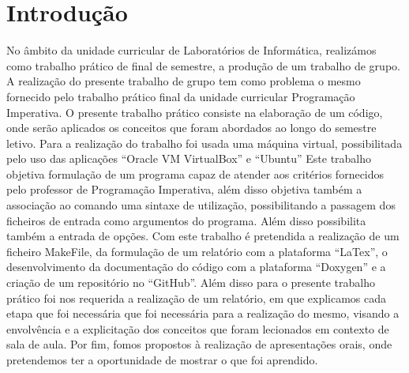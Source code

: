 \documentclass[a4wide]{report}
\begin{document}
\chapter{Introdução}
\Large
No âmbito da unidade curricular de Laboratórios de Informática, realizámos como trabalho prático de final de semestre, a produção de um trabalho de grupo. A realização do presente trabalho de grupo tem como problema o mesmo fornecido pelo trabalho prático final da unidade curricular Programação Imperativa. O presente trabalho prático consiste na elaboração de um código, onde serão aplicados os conceitos que foram abordados ao longo do semestre letivo. Para a realização do trabalho foi usada uma máquina virtual, possibilitada pelo uso das aplicações “Oracle VM VirtualBox” e “Ubuntu” Este trabalho objetiva formulação de um programa capaz de atender aos critérios fornecidos pelo professor de Programação Imperativa, além disso objetiva também a associação ao comando uma sintaxe de utilização, possibilitando a passagem dos ficheiros de entrada como argumentos do programa. Além disso possibilita também a entrada de opções. Com este trabalho é pretendida a realização de um ficheiro MakeFile, da formulação de um relatório com a plataforma “LaTex”, o desenvolvimento da documentação do código com a plataforma “Doxygen” e a criação de um repositório no “GitHub”. Além disso para o presente trabalho prático foi nos requerida a realização de um relatório, em que explicamos cada etapa que foi necessária que foi necessária para a realização do mesmo, visando a envolvência e a explicitação dos conceitos que foram lecionados em contexto de sala de aula. Por fim, fomos propostos à realização de apresentações orais, onde pretendemos ter a oportunidade de mostrar o que foi aprendido.
\end{document}
